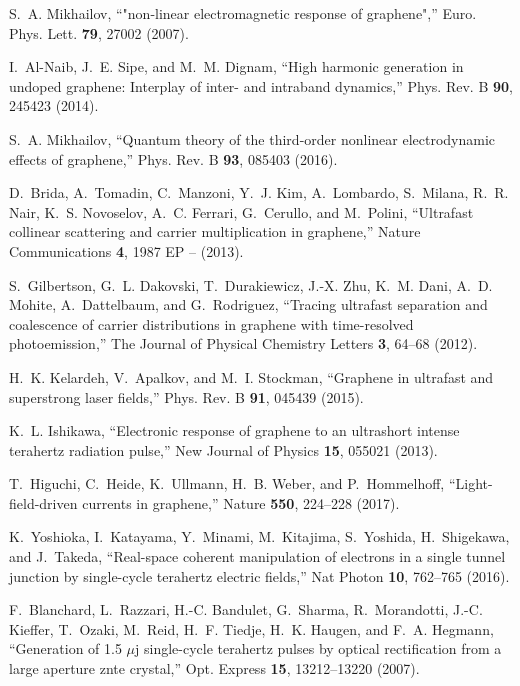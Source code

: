 \documentclass[9pt,twocolumn,twoside]{osajnl}
\begin{document}
\begin{thebibliography}{10}
S.~A. Mikhailov, \enquote{"non-linear electromagnetic response of graphene",}
  Euro. Phys. Lett. \textbf{79}, 27002 (2007).

I.~Al-Naib, J.~E. Sipe, and M.~M. Dignam, \enquote{High harmonic generation in
  undoped graphene: Interplay of inter- and intraband dynamics,} Phys. Rev. B
  \textbf{90}, 245423 (2014).

S.~A. Mikhailov, \enquote{Quantum theory of the third-order nonlinear
  electrodynamic effects of graphene,} Phys. Rev. B \textbf{93}, 085403 (2016).

D.~Brida, A.~Tomadin, C.~Manzoni, Y.~J. Kim, A.~Lombardo, S.~Milana, R.~R.
  Nair, K.~S. Novoselov, A.~C. Ferrari, G.~Cerullo, and M.~Polini,
  \enquote{Ultrafast collinear scattering and carrier multiplication in
  graphene,} Nature Communications \textbf{4}, 1987 EP -- (2013).

S.~Gilbertson, G.~L. Dakovski, T.~Durakiewicz, J.-X. Zhu, K.~M. Dani, A.~D.
  Mohite, A.~Dattelbaum, and G.~Rodriguez, \enquote{Tracing ultrafast
  separation and coalescence of carrier distributions in graphene with
  time-resolved photoemission,} The Journal of Physical Chemistry Letters
  \textbf{3}, 64--68 (2012).

H.~K. Kelardeh, V.~Apalkov, and M.~I. Stockman, \enquote{Graphene in ultrafast
  and superstrong laser fields,} Phys. Rev. B \textbf{91}, 045439 (2015).

K.~L. Ishikawa, \enquote{Electronic response of graphene to an ultrashort
  intense terahertz radiation pulse,} New Journal of Physics \textbf{15},
  055021 (2013).

T.~Higuchi, C.~Heide, K.~Ullmann, H.~B. Weber, and P.~Hommelhoff,
  \enquote{{Light-field-driven currents in graphene},} Nature \textbf{550},
  224--228 (2017).

K.~Yoshioka, I.~Katayama, Y.~Minami, M.~Kitajima, S.~Yoshida, H.~Shigekawa, and
  J.~Takeda, \enquote{Real-space coherent manipulation of electrons in a single
  tunnel junction by single-cycle terahertz electric fields,} Nat Photon
  \textbf{10}, 762--765 (2016).

F.~Blanchard, L.~Razzari, H.-C. Bandulet, G.~Sharma, R.~Morandotti, J.-C.
  Kieffer, T.~Ozaki, M.~Reid, H.~F. Tiedje, H.~K. Haugen, and F.~A. Hegmann,
  \enquote{Generation of 1.5 $\mu$j single-cycle terahertz pulses by optical
  rectification from a large aperture znte crystal,} Opt. Express \textbf{15},
  13212--13220 (2007).


\end{thebibliography}
\end{document}
